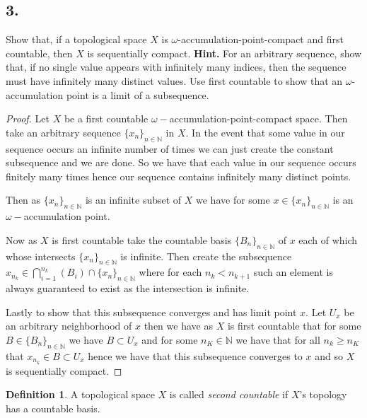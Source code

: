 \documentclass{amsart}
\theoremstyle{plain}
\theoremstyle{definition}
\newtheorem{definition}[theorem]{Definition}
\theoremstyle{remark}
\begin{document}
\vspace{.15in}
\noindent
\subsection*{3.} Show that, if a topological space $X$ is $\omega$-accumulation-point-compact and first countable, then $X$ is sequentially compact. {\bfseries Hint.} For an arbitrary sequence, show that, if no single value appears with infinitely many indices, then the sequence must have infinitely many distinct values. Use first countable to show that an $\omega$-accumulation point is a limit of a subsequence. 


\begin{proof}
    Let $X$ be a first countable $\omega-$accumulation-point-compact space. Then take an arbitrary sequence $\{x_n\}_{n\in \mathbb{N}}$ in $X$. In the event that some value in our sequence occurs an infinite number of times we can just create the constant subsequence and we are done. So we have that each value in our sequence occurs finitely many times hence our sequence contains infinitely many distinct points. 

    Then as $\{x_n\}_{n\in \mathbb{N}}$ is an infinite subset of $X$ we have for some $x \in \{x_n\}_{n\in \mathbb{N}}$ is an $\omega-$accumulation point. 
    
    Now as $X$ is first countable take the countable basis $\{B_n\}_{n\in \mathbb{N}}$ of $x$ each of which whose intersects $\{x_n\}_{n\in \mathbb{N}}$ is infinite. Then create the subsequence $x_{n_k}\in \bigcap_{i=1}^{n_k} (B_i ) \cap \{x_n\}_{n\in \mathbb{N}}$ where for each $n_k<n_{k+1}$ such an element is always guaranteed to exist as the intersection is infinite. 
    
    Lastly to show that this subsequence converges and has limit point $x$. Let $U_x$ be an arbitrary neighborhood of $x$ then we have as $X$ is first countable that for some $B\in \{B_n\}_{n\in \mathbb N}$  we have $B\subset U_x$ and for some $n_K\in \mathbb{N}$ we have that for all $n_k \geq n_K$ that $x_{n_k} \in B\subset U_x$ hence we have that this subsequence converges to $x$ and so $X$ is sequentially compact.

    
\end{proof}

\vspace{.15in}
\begin{definition} A topological space $X$ is called {\it second countable} if $X$'s topology has a countable basis. \end{definition}
\end{document}
